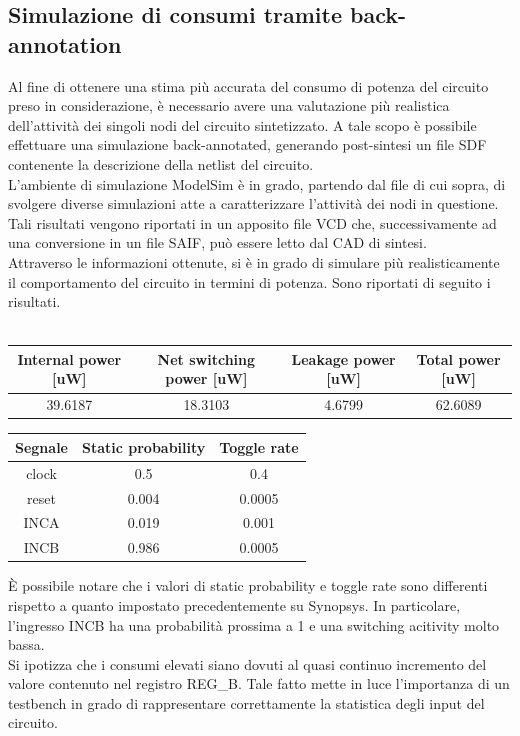 \documentclass[11pt,  english, makeidx, a4paper, titlepage, oneside]{book}
\begin{document}
\subsection{Simulazione di consumi tramite back-annotation}
Al fine di ottenere una stima più accurata del consumo di potenza del circuito preso in considerazione, è necessario avere una valutazione più realistica dell'attività dei singoli nodi del circuito sintetizzato. A tale scopo è possibile effettuare una simulazione back-annotated, generando post-sintesi un file SDF contenente la descrizione della netlist del circuito.
\\
L'ambiente di simulazione ModelSim è in grado, partendo dal file di cui sopra, di svolgere diverse simulazioni atte a caratterizzare l'attività dei nodi in questione. Tali risultati vengono riportati in un apposito file VCD che, successivamente ad una conversione in un file SAIF, può essere letto dal CAD di sintesi.
\\
Attraverso le informazioni ottenute, si è in grado di simulare più realisticamente il comportamento del circuito in termini di potenza. Sono riportati di seguito i risultati.
\\\\
\begin{center}
	\begin{tabular}{|c|c|c|c|}
	\hline
	Internal power [uW] & Net switching power [uW] & Leakage power [uW] & Total power [uW] \\
	\hline
	 39.6187 & 18.3103  & 4.6799  &  62.6089 \\
	\hline
	\end{tabular}	
\end{center}
\vspace{0.3cm}
\begin{center}
	\begin{tabular}{|c|c|c|}
	\hline
Segnale & Static probability & Toggle rate \\
	\hline
	 clock & 0.5  &  0.4 \\
	\hline
	 reset & 0.004  &  0.0005 \\
	\hline
	 INCA & 0.019  &  0.001 \\
	\hline
	 INCB & 0.986  &  0.0005 \\
	\hline
	\end{tabular}	
\end{center}
\vspace{0.3cm}
È possibile notare che i valori di static probability e toggle rate sono differenti rispetto a quanto impostato precedentemente su Synopsys. In particolare, l'ingresso INCB ha una probabilità prossima a 1 e una switching acitivity molto bassa.
\\
Si ipotizza che i consumi elevati siano dovuti al quasi continuo incremento del valore contenuto nel registro REG\_B. Tale fatto mette in luce l'importanza di un testbench in grado di rappresentare correttamente la statistica  degli input del circuito.
\newpage
\end{document}
